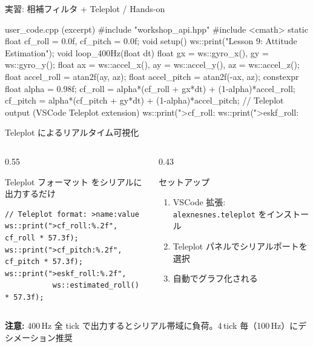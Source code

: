 \begin{frame}[fragile]{実習: 相補フィルタ + Teleplot / Hands-on}
  \begin{sflisting}[basicstyle=\ttfamily\scriptsize]{user\_code.cpp (excerpt)}
#include "workshop_api.hpp"
#include <cmath>
static float cf_roll = 0.0f, cf_pitch = 0.0f;
void setup() { ws::print("Lesson 9: Attitude Estimation"); }
void loop_400Hz(float dt) {
    float gx = ws::gyro_x(), gy = ws::gyro_y();
    float ax = ws::accel_x(), ay = ws::accel_y(),
          az = ws::accel_z();
    float accel_roll  = atan2f(ay, az);
    float accel_pitch = atan2f(-ax, az);
    constexpr float alpha = 0.98f;
    cf_roll  = alpha*(cf_roll + gx*dt) + (1-alpha)*accel_roll;
    cf_pitch = alpha*(cf_pitch + gy*dt) + (1-alpha)*accel_pitch;
    // Teleplot output (VSCode Teleplot extension)
    ws::print(">cf_roll:%
    ws::print(">eskf_roll:%
}
  \end{sflisting}
\end{frame}

\begin{frame}[fragile]{Teleplot によるリアルタイム可視化}
  \begin{columns}[c]
    \begin{column}{0.55\textwidth}
      \begin{block}{Teleplot フォーマット}
         をシリアルに出力するだけ
      \end{block}
      \begin{lstlisting}[style=sfcpp, basicstyle=\ttfamily\scriptsize]
// Teleplot format: >name:value
ws::print(">cf_roll:%.2f", cf_roll * 57.3f);
ws::print(">cf_pitch:%.2f", cf_pitch * 57.3f);
ws::print(">eskf_roll:%.2f",
           ws::estimated_roll() * 57.3f);
      \end{lstlisting}
    \end{column}
    \begin{column}{0.43\textwidth}
      \begin{exampleblock}{セットアップ}
        \begin{enumerate}
          \item VSCode 拡張: \texttt{alexnesnes.teleplot} をインストール
          \item Teleplot パネルでシリアルポートを選択
          \item 自動でグラフ化される
        \end{enumerate}
      \end{exampleblock}
    \end{column}
  \end{columns}

  \vspace{0.5em}
  {\footnotesize \textbf{注意:} 400\,Hz 全 tick で出力するとシリアル帯域に負荷。4\,tick 毎（100\,Hz）にデシメーション推奨}
\end{frame}

